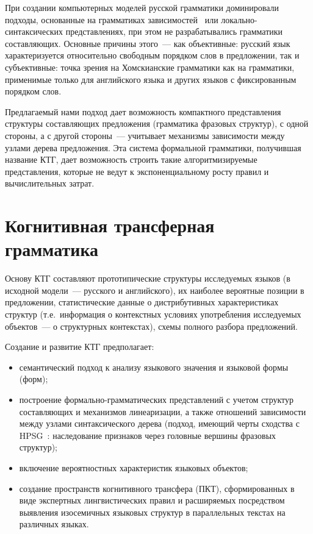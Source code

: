 \begin{multicols}{2}
При создании компьютерных моделей русской грамматики доминировали
подходы, основанные на грамматиках зависимостей~\cite{9koz}  или
локально-синтаксических представлениях, при этом не разрабатывались
грамматики составляющих. Основные причины этого~--- как объективные:
русский язык характеризуется относительно свободным порядком слов в
предложении, так и субъективные:  точка зрения на Хомскианские
грамматики как на грамматики, применимые только для английского языка и
других языков с фиксированным порядком слов.

Предлагаемый нами подход дает возможность компактного представления структуры 
со\-став\-ля\-ющих предложения (грамматика фразовых структур), с одной стороны, 
а с другой стороны~--- учитывает механизмы зависимости между узлами дерева 
предложения. Эта система формальной грамматики, получившая название КТГ, дает 
возможность строить такие алгоритмизируемые представления, которые не ведут к 
экспоненциальному росту правил и вычислительных затрат.

\section{Когнитивная трансферная грамматика}

Основу КТГ составляют
прототипические структуры исследуемых языков (в исходной модели~---
русского и английского), их наиболее вероятные позиции в предложении,
статистические данные о дистрибутивных характеристиках структур (т.е.\
информация о контекстных условиях употребления ис\-сле\-ду\-емых
объектов~---  о структурных контекстах), схемы полного разбора
предложений.

Создание и развитие КТГ предполагает:
\begin{itemize}
\item семантический подход к анализу языкового значения и языковой
формы (форм);
\item построение формально-грамматических представлений с учетом
структур составляющих и механизмов линеаризации, а также отношений
зависимости между узлами синтаксического дерева (подход, имеющий черты
сходства с HPSG~\cite{10koz}: наследование признаков через головные
вершины фразовых структур);
\item  включение вероятностных характеристик языковых объектов;
\item создание пространств когнитивного трансфера (ПКТ),
сформированных в виде экспертных лингвистических правил и
расширяемых посредством выявления  изосемичных языковых структур в
параллельных текстах на различных языках.
\end{itemize}


\end{multicols}
